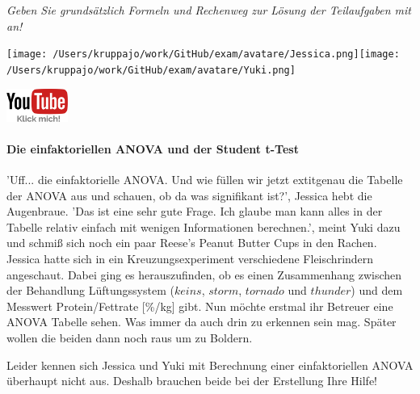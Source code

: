 \documentclass[a4paper, 9pt]{scrartcl}\usepackage[]{graphicx}\usepackage[]{xcolor}
\begin{document}
\textit{Geben Sie grundsätzlich Formeln und Rechenweg zur Lösung der Teilaufgaben mit an!} \\[1Ex]
 

 
\begin{minipage}[t]{0.5\textwidth}
\texttt{[image: /Users/kruppajo/work/GitHub/exam/avatare/Jessica.png]}\hspace{-4mm}\texttt{[image: /Users/kruppajo/work/GitHub/exam/avatare/Yuki.png]}
\end{minipage}
\begin{minipage}[t]{0.5\textwidth}
\hfill
\href{https://youtu.be/49hvImMwVyE}{\includegraphics[width = 2cm]{img/youtube}}
\end{minipage}



\paragraph{Die einfaktoriellen ANOVA und der Student t-Test}

'Uff... die einfaktorielle ANOVA. Und wie füllen wir jetzt 	extit{genau} die Tabelle der ANOVA aus und schauen, ob da was signifikant ist?', Jessica hebt die Augenbraue. 'Das ist eine sehr gute Frage. Ich glaube man kann alles in der Tabelle relativ einfach mit wenigen Informationen berechnen.', meint Yuki dazu und schmiß sich noch ein paar Reese's Peanut Butter Cups in den Rachen. Jessica hatte sich in ein Kreuzungsexperiment verschiedene Fleischrindern angeschaut. Dabei ging es herauszufinden, ob es einen Zusammenhang zwischen der Behandlung Lüftungssystem ($keins$, $storm$, $tornado$ und $thunder$) und dem Messwert Protein/Fettrate [\%/kg] gibt. Nun möchte erstmal ihr Betreuer eine ANOVA Tabelle sehen. Was immer da auch drin zu erkennen sein mag. Später wollen die beiden dann noch raus um zu Boldern.



\vspace{1ex}

Leider kennen sich Jessica und Yuki mit Berechnung einer einfaktoriellen ANOVA überhaupt nicht aus. Deshalb brauchen beide bei der Erstellung Ihre Hilfe! 
\end{document}
